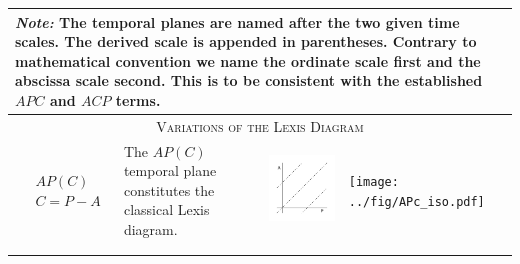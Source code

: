 \documentclass[
  12pt
]{scrartcl}
\begin{document}

\begin{center}
  \small
  \begin{longtable}{m{}m{}m{}m{}}
  \toprule
  \multicolumn{4}{m{0.9\textwidth}}{\footnotesize \emph{Note:} The temporal planes are named after the two given time scales. The derived scale is appended in parentheses. Contrary to mathematical convention we name the ordinate scale first and the abscissa scale second. This is to be consistent with the established $APC$ and $ACP$ terms.} \\
  \midrule
  \multicolumn{4}{c}{\textsc{Variations of the Lexis Diagram}} \\
  \midrule
  $$\begin{aligned}
    &AP(C) \\
    &C = P - A
  \end{aligned}$$ &
  The $AP(C)$ temporal plane constitutes the classical Lexis diagram. &
  \includegraphics[width = \linewidth]{../fig/APc.pdf} &
  \texttt{[image: ../fig/APc\_iso.pdf]}  \\
  \midrule
  $$\begin{aligned}

\end{aligned}$$
\end{longtable}
\end{center}
\end{document}
